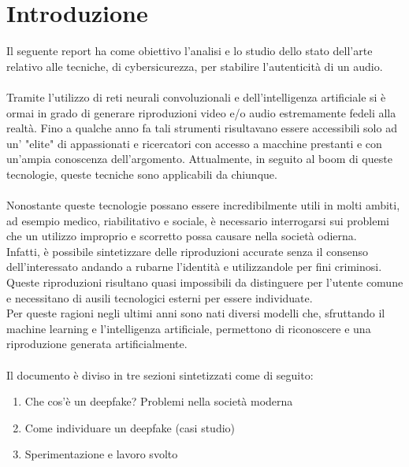 \documentclass[12pt, a4paper]{article}
\begin{document}


\newpage

\section{Introduzione}
Il seguente report ha come obiettivo l'analisi e lo studio dello stato dell'arte relativo alle tecniche, di cybersicurezza, per stabilire l'autenticità di un audio. \\\\
Tramite l'utilizzo di reti neurali convoluzionali e dell'intelligenza artificiale si è ormai in grado di generare riproduzioni video e/o audio estremamente fedeli alla realtà. Fino a qualche anno fa tali strumenti risultavano essere accessibili solo ad un' "elite" di appassionati e ricercatori con accesso a macchine prestanti e con un'ampia conoscenza dell'argomento. Attualmente, in seguito al boom di queste tecnologie, queste tecniche sono applicabili da chiunque.
\\\\
Nonostante queste tecnologie possano essere incredibilmente utili in molti ambiti, ad esempio medico, riabilitativo e sociale, è necessario interrogarsi sui problemi che un utilizzo improprio e scorretto possa causare nella società odierna.\\
Infatti, è possibile sintetizzare delle riproduzioni accurate senza il consenso dell'interessato andando a rubarne l'identità e utilizzandole per fini criminosi.
Queste riproduzioni risultano quasi impossibili da distinguere per l'utente comune e necessitano di ausili tecnologici esterni per essere individuate. \\
Per queste ragioni negli ultimi anni sono nati diversi modelli che, sfruttando il machine learning e l'intelligenza artificiale, permettono di riconoscere e una riproduzione generata artificialmente. 
\\\\
Il documento è diviso in tre sezioni sintetizzati come di seguito: 
\begin{enumerate}
    \item Che cos'è un deepfake? Problemi nella società moderna
    \item Come individuare un deepfake (casi studio)
    \item Sperimentazione e lavoro svolto
\end{enumerate}
\end{document}
